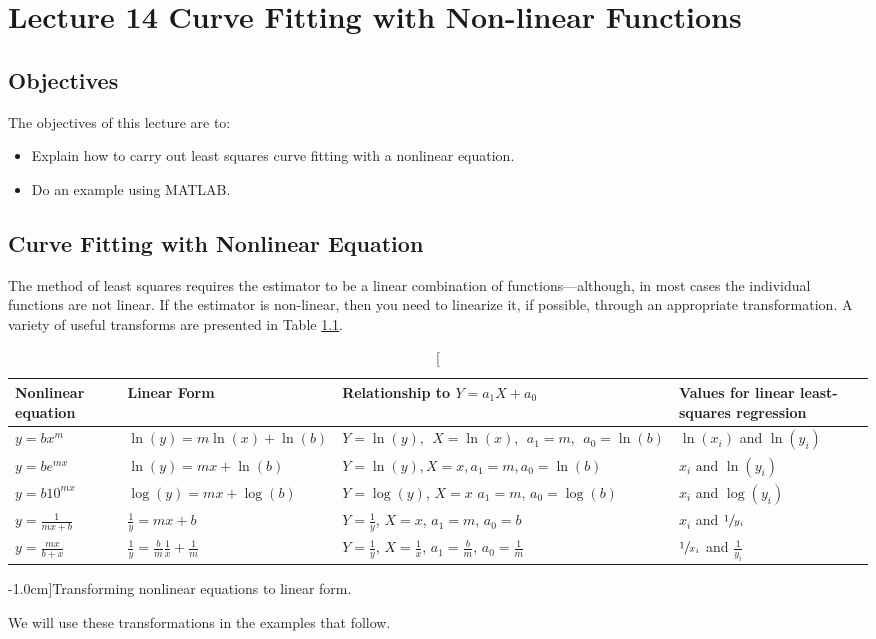 \chapter{Lecture 14 Curve Fitting with Non-linear Functions}
\label{ch:lec14n}
\section{Objectives}
The objectives of this lecture are to:
\begin{itemize}
\item Explain how to carry out least squares curve fitting with a nonlinear equation.
\item Do an example using MATLAB.
\end{itemize}
\setcounter{lstannotation}{0}

\section{Curve Fitting with Nonlinear Equation}
The method of least squares requires the estimator to be a linear combination of functions---although, in most cases the individual functions are not linear. If the estimator is non-linear, then you need to linearize it, if possible, through an appropriate transformation.  A variety of useful transforms are presented in Table \ref{transform}.\cite[-2.5cm]{gilat}

\begin{table}[h]
\centering
\begin{tabular}{|p{0.75in}|p{1.55in}|p{1.25in}|p{1.3in}|}
\hline
Nonlinear equation & Linear Form & Relationship to $Y = a_{1}X + a_{0}$ &
Values for linear least-squares regression \\
\hline
$ y = bx^{m}$ & $\ln(y)=m\ln(x)+\ln(b)$ & $Y = \ln(y),\ \  X = \ln(x),
\ \  a_{1} = m, \ \  a_{0} = \ln(b) $ & $\ln(x_{i})$ and $\ln(y_{i})$ \\
\hline
$y = be^{mx}$ & $\ln(y)=mx+\ln(b)$ & $Y = \ln(y), X=x, a_{1}=m, a_{0} = \ln(b)$ &
$x_{i} \text{ and } \ln(y_{i})$ \\
\hline
$y = b10^{mx}$ & $\log(y) = mx + \log(b)$ & $Y = \log(y)$, $X=x$ $a_{1}=m$,
$a_{0} = \log(b)$  & $x_{i}$ and $\log(y_{i})$ \\
\hline
$y = \frac{1}{mx + b}$ & $\frac{1}{y} = mx + b$ & $Y=\frac{1}{y}$, $X=x$,
$a_{1}=m$, $a_{0} = b$ & $x_{i}$ and $\sfrac{1}{y_{i}}$ \\
\hline
$y = \frac{mx}{b + x}$ & $\frac{1}{y} = \frac{b}{m}\frac{1}{x} + \frac{1}{m} $
& $Y=\frac{1}{y}$, $X=\frac{1}{x}$, $a_{1}=\frac{b}{m}$, $a_{0}=\frac{1}{m}$ &
$\sfrac{1}{x_{i}}$ and $\frac{1}{y_{i}}$ \\
\hline
\end{tabular}
\caption[][-1.0cm]{Transforming nonlinear equations to linear form.}
\label{transform}
\end{table}
We will use these transformations in the examples that follow.

